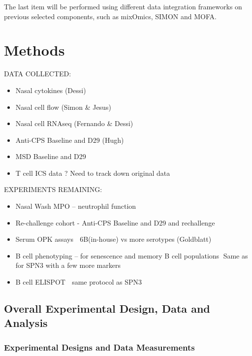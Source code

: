 \documentclass[
]{book}
\begin{document}
The last item will be performed using different data integration frameworks on previous selected components, such as mixOmics, SIMON and MOFA.

\hypertarget{methods}{%
\chapter{Methods}\label{methods}}

DATA COLLECTED:

\begin{itemize}
\item
  Nasal cytokines (Dessi)
\item
  Nasal cell flow (Simon \& Jesus)
\item
  Nasal cell RNAseq (Fernando \& Dessi)
\item
  Anti-CPS Baseline and D29 (Hugh)
\item
  MSD Baseline and D29
\item
  T cell ICS data ? Need to track down original data
\end{itemize}

EXPERIMENTS REMAINING:

\begin{itemize}
\item
  Nasal Wash MPO -- neutrophil function
\item
  Re-challenge cohort - Anti-CPS Baseline and D29 and rechallenge
\item
  Serum OPK assays  6B(in-house) vs more serotypes (Goldblatt)
\item
  B cell phenotyping -- for senescence and memory B cell populations Same as for SPN3 with a few more markers
\item
  B cell ELISPOT  same protocol as SPN3
\end{itemize}

\hypertarget{overall-experimental-design-data-and-analysis}{%
\section{Overall Experimental Design, Data and Analysis}\label{overall-experimental-design-data-and-analysis}}

\hypertarget{experimental-designs-and-data-measurements}{%
\subsection{Experimental Designs and Data Measurements}\label{experimental-designs-and-data-measurements}}
\end{document}
